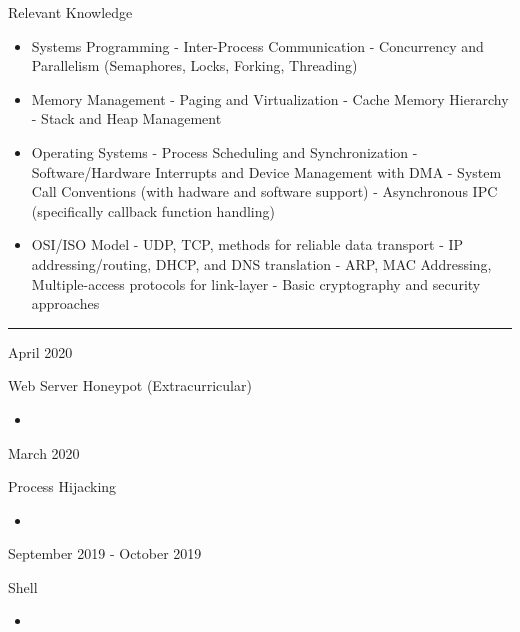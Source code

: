 \documentclass[a4paper]{article}
\newlength{\cvcolumngapwidth}
\newlength{\cvleftcolumnwidth}
\newlength{\cvrightcolumnwidth}
\newcommand{\cvsectionstyle}[1]{{\normalsize\cvsectionfont\textcolor{cvsectioncolor}{#1}}}
\newcommand{\cvtitlestyle}[1]{{\large\cvtitlefont\textcolor{cvtitlecolor}{#1}}}
\newcommand{\cvdurationstyle}[1]{{\small\cvdurationfont\textcolor{cvdurationcolor}{#1}}}
\newcommand{\cvheadingstyle}[1]{{\normalsize\cvheadingfont\textcolor{cvheadingcolor}{#1}}}
\newlength{\cvafteritemskipamount}
\newlength{\cvaftersectionskipamount}
\newlength{\cvaftertitleskipamount}
\newlength{\cvparskip}
\newcommand{\cvsection}[1]{
    \begin{minipage}[t]{\cvleftcolumnwidth}
        \raggedleft\cvsectionstyle{#1}
    \end{minipage}%
    \hspace{\cvcolumngapwidth}%
    \begin{minipage}[t]{\cvrightcolumnwidth}
        \textcolor{cvrulecolor}{\rule{\cvrightcolumnwidth}{0.3mm}}
    \end{minipage}

    \vspace{\cvaftersectionskipamount}
}
\newcommand{\cvitem}[2]{
    \begin{minipage}[t]{\cvleftcolumnwidth}
        \raggedleft #1
    \end{minipage}%
    \hspace{\cvcolumngapwidth}%
    \begin{minipage}[t]{\cvrightcolumnwidth}
        \setlength{\parskip}{\cvparskip} #2
    \end{minipage}

    \vspace{\cvafteritemskipamount}
}
\newcommand{\cvtitle}[1]{
    \cvtitlestyle{#1}

    \vspace{\cvaftertitleskipamount}
    \vspace{-\cvparskip}
}
\begin{document}
\cvitem{
    \cvheadingstyle{Relevant Knowledge}
}{
    \begin{itemize}[leftmargin=*]
      \item Systems Programming
        \subitem - Inter-Process Communication
        \subitem - Concurrency and Parallelism (Semaphores, Locks, Forking, Threading)

      \item Memory Management
        \subitem - Paging and Virtualization
        \subitem - Cache Memory Hierarchy
        \subitem - Stack and Heap Management


      \item Operating Systems
        \subitem - Process Scheduling and Synchronization
        \subitem - Software/Hardware Interrupts and Device Management with DMA
        \subitem - System Call Conventions (with hadware and software support)
        \subitem - Asynchronous IPC (specifically callback function handling)

      \item OSI/ISO Model
        \subitem - UDP, TCP, methods for reliable data transport
        \subitem - IP addressing/routing, DHCP, and DNS translation
        \subitem - ARP, MAC Addressing, Multiple-access protocols for link-layer
        \subitem - Basic cryptography and security approaches
      \end{itemize}
}


\cvsection{PROJECTS}

\cvitem{
    \cvdurationstyle{April 2020}
}{
  \cvtitle{Web Server Honeypot (Extracurricular)}

    \begin{itemize}[leftmargin=*]
        \item 
    \end{itemize}
}

% 
\cvitem{
    \cvdurationstyle{March 2020}
}{
    \cvtitle{Process Hijacking}

    \begin{itemize}[leftmargin=*]
        \item 
    \end{itemize}
}

\cvitem{
    \cvdurationstyle{September 2019 - October 2019}
}{
    \cvtitle{Shell}

    \begin{itemize}[leftmargin=*]
        \item 
    \end{itemize}
}
\end{document}
